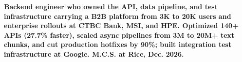 \item\small{\textbf{Backend engineer who owned the API, data pipeline, and test infrastructure carrying a B2B platform from \textbf{3K to 20K} users and enterprise rollouts at \textbf{CTBC Bank, MSI, and HPE}. Optimized \textbf{140+} APIs (\textbf{27.7\%} faster), scaled async pipelines from 3M to \textbf{20M+} text chunks, and cut production hotfixes by \textbf{90\%}; built integration test infrastructure at \textbf{Google}. M.C.S. at Rice, Dec. 2026.}}%
